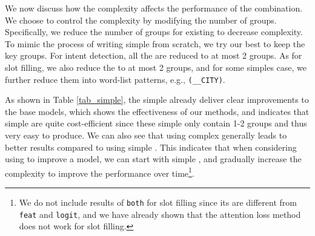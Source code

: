 We now discuss how the \RE complexity affects the performance of the combination.
We choose to control the \RE complexity by modifying the number of groups.
%
Specifically, we reduce the number of groups for existing \REs to decrease \RE complexity.
To mimic the process of writing simple \REs from scratch, we try our best to keep the key \RE groups.
For intent detection, all the \REs are reduced to at most 2 groups. %
As for slot filling, we also reduce the \REs to at most 2 groups, and for some simples case, we further reduce them into  word-list patterns, e.g., \texttt{(\_\_CITY)}.

As shown in Table \ref{tab_simple}, the simple \REs already deliver clear improvements to the base \NN models, which shows the
effectiveness of our methods, and indicates that simple \REs are quite cost-efficient since these simple \REs only contain 1-2 \RE groups
and thus very easy to produce. We can also see that using complex \REs generally leads to better results compared to using simple \REs.
This indicates that when considering using \REs to improve a \NN model, we can start with simple \REs, and gradually increase the \RE
complexity to improve the performance over time\footnote{We do not include results of \texttt{both} for slot filling since its \REs are
different from \texttt{feat} and \texttt{logit}, and we have already shown that the attention loss method does not work for slot filling.}.



